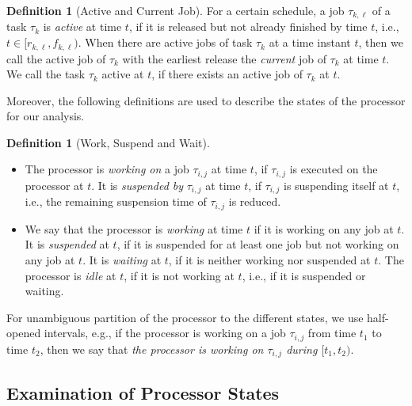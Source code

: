 \documentclass[conference]{IEEEtran}
\theoremstyle{definition}
\newtheorem{defn}[thm]{Definition}
\theoremstyle{remark}
\begin{document}
\begin{defn}[Active and Current Job]
For a certain schedule, a job $\tau_{k,\ell}$ of a task $\tau_k$ is \emph{active} at time $t$,
if it is released but not already finished by time $t$, i.e., $t \in [r_{k,\ell}, f_{k,\ell})$.
When there are active jobs of task $\tau_k$ at a time instant $t$, then we call the active job of $\tau_k$ with the earliest release the
\emph{current}
job of $\tau_k$ at time $t$.
We call the task $\tau_k$ active at $t$, if there exists an active job of $\tau_k$ at $t$.
\end{defn}

Moreover, the following definitions are used to describe the states of the processor for our analysis.

\begin{defn}[Work, Suspend and Wait]
	~
	\begin{itemize}
		\item  The processor is \emph{working on} a job $\tau_{i,j}$ at time $t$, if $\tau_{i,j}$ is executed on the processor at $t$.
		It is \emph{suspended by} $\tau_{i,j}$ at time $t$, if $\tau_{i,j}$ is suspending itself at $t$, i.e., the remaining suspension time of $\tau_{i,j}$ is reduced.
		\item We say that the processor is \emph{working} at time $t$ if it is working on any job at $t$.
		It is \emph{suspended} at $t$, if it is suspended for at least one job but not working on any job at $t$.
		It is \emph{waiting} at $t$, if it is neither working nor suspended at $t$. The processor is \emph{idle} at $t$, if it is not working at $t$, i.e., if it is suspended or waiting.
	\end{itemize}
\end{defn}

For unambiguous partition of the processor to the different states, we use half-opened intervals, e.g., if the processor is working on a job $\tau_{i,j}$ from time $t_1$ to time $t_2$, then we say that \emph{the processor is working on $\tau_{i,j}$ during $[t_1,t_2)$}.

\subsection{Examination of Processor States}
\label{sec:processor_states}
	
\end{document}
